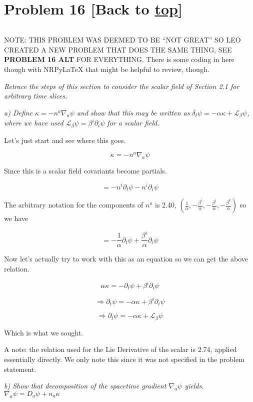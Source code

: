 \documentclass[landscape,letterpaper,10pt,english]{article}
\begin{document}
    \hypertarget{problem-16-back-to-top}{%
\section{\texorpdfstring{Problem 16 {[}Back to
\hyperref[toc]{top}{]}}{Problem 16 {[}Back to {]}}}\label{problem-16-back-to-top}}

\[\label{P16}\]

NOTE: THIS PROBLEM WAS DEEMED TO BE ``NOT GREAT'' SO LEO CREATED A NEW
PROBLEM THAT DOES THE SAME THING, SEE \textbf{PROBLEM 16 ALT} FOR
EVERYTHING. There is some coding in here though with NRPyLaTeX that
might be helpful to review, though.

\emph{Retrace the steps of this section to consider the scalar field of
Section 2.1 for arbitrary time slices.}

\emph{a) Define \(\kappa = -n^a \nabla_a \psi\) and show that this may
be written as
\(\delta_t \psi = -\alpha \kappa + \mathcal{L}_\beta \psi\), where we
have used \(\mathcal{L}_\beta \psi = \beta^i \partial_i \psi\) for a
scalar field.}

    Let's just start and see where this goes.

\[\kappa = -n^a \nabla_a \psi\]

Since this is a scalar field covariants become partials.

\[ = -n^t \partial_t \psi - n^i \partial_i \psi  \]

The arbitrary notation for the components of \(n^a\) is 2.40,
\((\frac1\alpha,-\frac{\beta^i}{\alpha},-\frac{\beta^j}{\alpha},-\frac{\beta^k}{\alpha})\)
so we have

\[ = -\frac{1}{\alpha} \partial_t \psi + \frac{\beta^i}{\alpha} \partial_i \psi  \]

Now let's actually try to work with this as an equation so we can get
the above relation.

\[ \alpha\kappa = -\partial_t \psi + \beta^i \partial_i \psi \]

\[ \Rightarrow \partial_t \psi = -\alpha \kappa + \beta^i \partial_i \psi \]

\[ \Rightarrow \partial_t \psi = -\alpha \kappa + \mathcal{L}_\beta \psi \]

Which is what we sought.

    A note: the relation used for the Lie Derivative of the scalar is 2.74,
applied essentially directly. We only note this since it was not
specified in the problem statement.

    \emph{b) Show that decomposition of the spacetime gradient
\(\nabla_a \psi\) yields. \(\nabla_a \psi = D_a \psi + n_a \kappa\)}
\end{document}
